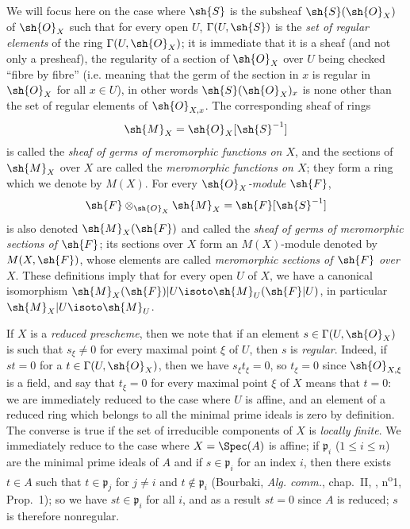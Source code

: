 \begin{env}[20.1.3]
\label{IV.20.1.3}
We will focus here on the case where $\sh{S}$ is the subsheaf $\sh{S}(\sh{O}_X)$ of $\sh{O}_X$ such that for every open $U$, $\Gamma(U,\sh{S})$ is the \emph{set of regular elements} of the ring $\Gamma(U,\sh{O}_X)$;
it is immediate that it is a sheaf (and not only a presheaf), the regularity of a section of $\sh{O}_X$ over $U$ being checked ``fibre by fibre'' (i.e. meaning that the germ of the section in $x$ is regular in $\sh{O}_X$ for all $x\in U$), in other words $\sh{S}(\sh{O}_X)_x$ is none other than the set of regular elements of $\sh{O}_{X,x}$.
The corresponding sheaf of rings
\[
  \sh{M}_X=\sh{O}_X[\sh{S}^{-1}]
\]
is called the \emph{sheaf of germs of meromorphic functions on $X$}, and the sections of $\sh{M}_X$ over $X$ are called the \emph{meromorphic functions on $X$};
they form a ring which we denote by $M(X)$.
For every \emph{$\sh{O}_X$-module $\sh{F}$},
\[
  \sh{F}\otimes_{\sh{O}_X}\sh{M}_X=\sh{F}[\sh{S}^{-1}]
\]
is also denoted $\sh{M}_X(\sh{F})$ and called the \emph{sheaf of germs of meromorphic sections of $\sh{F}$};
its sections over $X$ form an $M(X)$-module denoted by $M(X,\sh{F})$, whose elements are called \emph{meromorphic sections of $\sh{F}$ over $X$}.
These definitions imply that for every open $U$ of $X$, we have a canonical isomorphism $\sh{M}_X(\sh{F})|U\isoto\sh{M}_U(\sh{F}|U)$, in particular $\sh{M}_X|U\isoto\sh{M}_U$.
\end{env}

\begin{env}[20.1.3.1]
\label{IV.20.1.3.1}
If $X$ is a \emph{reduced prescheme}, then we note that if an element $s\in\Gamma(U,\sh{O}_X)$ is such that $s_\xi\neq 0$ for every maximal point $\xi$ of $U$, then $s$ is \emph{regular}.
Indeed, if $st=0$ for a $t\in\Gamma(U,\sh{O}_X)$, then we have $s_\xi t_\xi=0$, so $t_\xi=0$ since $\sh{O}_{X,\xi}$ is a field, and say that $t_\xi=0$ for every maximal point $\xi$ of $X$ means that $t=0$:
we are immediately reduced to the case where $U$ is affine, and an element of a reduced ring which belongs to all the minimal prime ideals is zero by definition.
The converse is true if the set of irreducible components of $X$ is \emph{locally finite}.
We immediately reduce to the case where $X=\Spec(A)$ is affine;
if $\mathfrak{p}_i$ ($1\leq i\leq n$) are the minimal prime ideals of $A$ and if $s\in\mathfrak{p}_i$ for an index $i$, then there exists $t\in A$ such that $t\in\mathfrak{p}_j$ for $j\neq i$ and $t\not\in\mathfrak{p}_i$ (Bourbaki, \emph{Alg. comm.}, chap.~II, , n\textsuperscript{o}1, Prop.~1);
so we have $st\in\mathfrak{p}_i$ for all $i$, and as a result $st=0$ since $A$ is reduced;
$s$ is therefore nonregular.
\end{env}

